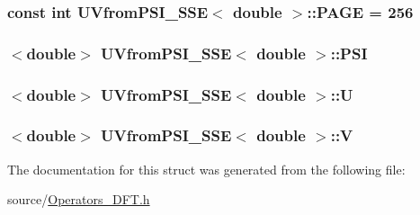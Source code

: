 \subsubsection[{P\+A\+G\+E}]{\setlength{\rightskip}{0pt plus 5cm}const int {\bf U\+Vfrom\+P\+S\+I\+\_\+\+S\+S\+E}$<$ double $>$\+::P\+A\+G\+E = 256\hspace{0.3cm}{\ttfamily [static]}}\label{struct_u_vfrom_p_s_i___s_s_e_3_01double_01_4_ab216503dd8df3019354f56281bb0dccb}
\hypertarget{struct_u_vfrom_p_s_i___s_s_e_3_01double_01_4_a85a52a48e0761ffe50e94a48ec6c652e}{}
\subsubsection[{P\+S\+I}]{$<$double$>$ {\bf U\+Vfrom\+P\+S\+I\+\_\+\+S\+S\+E}$<$ double $>$\+::P\+S\+I}\label{struct_u_vfrom_p_s_i___s_s_e_3_01double_01_4_a85a52a48e0761ffe50e94a48ec6c652e}
\hypertarget{struct_u_vfrom_p_s_i___s_s_e_3_01double_01_4_a4dc3dc281fa328c5b353e97610b762d8}{}
\subsubsection[{U}]{$<$double$>$ {\bf U\+Vfrom\+P\+S\+I\+\_\+\+S\+S\+E}$<$ double $>$\+::U}\label{struct_u_vfrom_p_s_i___s_s_e_3_01double_01_4_a4dc3dc281fa328c5b353e97610b762d8}
\hypertarget{struct_u_vfrom_p_s_i___s_s_e_3_01double_01_4_a7e5177ab59f35582a6782b43106ec3d8}{}
\subsubsection[{V}]{$<$double$>$ {\bf U\+Vfrom\+P\+S\+I\+\_\+\+S\+S\+E}$<$ double $>$\+::V}\label{struct_u_vfrom_p_s_i___s_s_e_3_01double_01_4_a7e5177ab59f35582a6782b43106ec3d8}


The documentation for this struct was generated from the following file\+:\begin{DoxyCompactItemize}
\item 
source/\hyperlink{_operators___d_f_t_8h}{Operators\+\_\+\+D\+F\+T.\+h}\end{DoxyCompactItemize}
